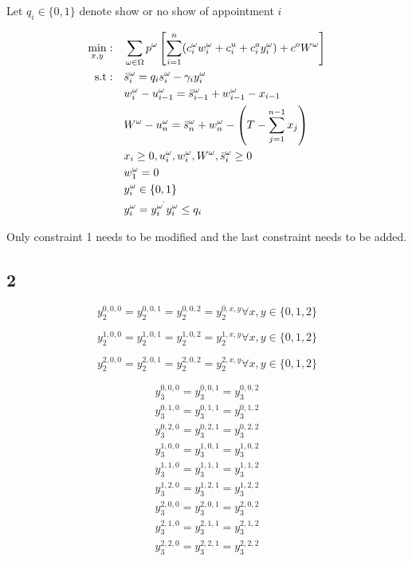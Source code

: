 \documentclass{report}
\begin{document}
Let $q_{i} \in \{0,1\}$ denote show or no show of appointment $i$ 

\begin{align*}
	\min_{x,y}: \quad & \sum_{\omega \in \Omega}^{} p^{\omega} \left[ \sum_{i=1}^{n}( c_{i}^{\omega} w_{i}^{\omega} + c_{i}^{u} + c_{i}^{a}y_{i}^{\omega} ) + c^{o}W^{\omega}\right]\\
\text{s.t}: \quad & \bar s_{i}^{\omega} = q_{i}s_{i}^{\omega} - \gamma_{i}y_{i}^{\omega} \\
		  &w_{i}^{\omega} - u_{i-1}^{\omega} = \bar s_{i-1}^{\omega} + w_{i-1}^{\omega} - x_{i-1} \\
		  &W^{\omega} - u_{n}^{\omega} = \bar s_{n}^{\omega}  + w_{n}^{\omega} - \left( T - \sum_{j=1}^{n-1} x_{j} \right) \\
		  &x_{i} \ge 0, u_{i}^{\omega}, w_{i}^{\omega}, W^{\omega}, \bar s_{i}^{\omega} \ge 0 \\
		  &w_{1}^{\omega} = 0 \\
		  &y_{i}^{\omega} \in \{0,1\}\\
		  &y_{i}^{\omega} = y_{i}^{\omega^{`}}
		  y_{i}^{\omega} \le q_{i}
\end{align*}

Only constraint 1 needs to be modified and the last constraint needs to be added.


\newpage
\subsection{2}

\[
	y_{2}^{0, 0, 0} = y_{2}^{0,0,1} = y_{2}^{0,0,2} = y_{2}^{0, x, y} \forall x,y \in \{0,1,2\}
\]

\[
	y_{2}^{1, 0, 0} = y_{2}^{1,0,1} = y_{2}^{1,0,2} = y_{2}^{1, x, y} \forall x,y \in \{0,1,2\}
\]


\[
	y_{2}^{2, 0, 0} = y_{2}^{2,0,1} = y_{2}^{2,0,2} = y_{2}^{2, x, y} \forall x,y \in \{0,1,2\}
\]

\begin{align*}
y_3^{0,0,0} = y_3^{0, 0, 1} = y_3^{0,0,2}\\
y_3^{0,1,0} = y_3^{0, 1, 1} = y_3^{0,1,2}\\
y_3^{0,2,0} = y_3^{0, 2, 1} = y_3^{0,2,2}\\
y_3^{1,0,0} = y_3^{1, 0, 1} = y_3^{1,0,2}\\
y_3^{1,1,0} = y_3^{1, 1, 1} = y_3^{1,1,2}\\
y_3^{1,2,0} = y_3^{1, 2, 1} = y_3^{1,2,2}\\
y_3^{2,0,0} = y_3^{2, 0, 1} = y_3^{2,0,2}\\
y_3^{2,1,0} = y_3^{2, 1, 1} = y_3^{2,1,2}\\
y_3^{2,2,0} = y_3^{2, 2, 1} = y_3^{2,2,2}\\
\end{align*}
\end{document}
